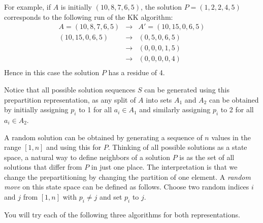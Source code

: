 \documentclass[11pt]{article}
\begin{document}
For example, if $A$ is initially $(10,8,7,6,5)$, the solution $P = (1,2,2,4,5)$
corresponds to the following run of the KK algorithm:
\begin{eqnarray*}
A = (10,8,7,6,5) & \rightarrow & A' = (10,15,0,6,5) \\
(10,15,0,6,5) & \rightarrow & (0,5,0,6,5) \\
 & \rightarrow & (0,0,0,1,5) \\
 & \rightarrow & (0,0,0,0,4) \\
\end{eqnarray*}
Hence in this case the solution $P$ has a residue of 4.

Notice that all possible solution sequences $S$ can be generated using this prepartition representation, as any split of $A$ into
sets $A_1$ and $A_2$ can be obtained by initially assigning 
$p_i$ to 1 for all $a_i \in A_1$ and similarly assigning 
$p_i$ to 2 for all $a_i \in A_2$.

A random solution can be obtained by generating a sequence of $n$
values in the range $[1,n]$ and using this for $P$.  Thinking of all
possible solutions as a state space, a natural way to define neighbors
of a solution $P$ is as the set of all solutions that differ from $P$
in just one place.  The interpretation is that we change the
prepartitioning by changing the partition of one element.
A {\em random move} on this state space can be defined as follows.
Choose two random indices $i$ and $j$ from $[1,n]$ with $p_i
\neq j$ and set $p_i$ to $j$.


You will try each of the following three algorithms for both
representations.
\end{document}

